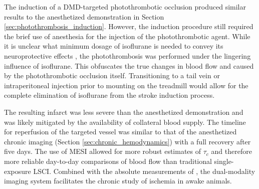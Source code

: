 The induction of a DMD-targeted photothrombotic occlusion produced similar results to the anesthetized demonstration in Section \ref{sec:photothrombosis_induction}. However, the induction procedure still required the brief use of anesthesia for the injection of the photothrombotic agent. While it is unclear what minimum dosage of isoflurane is needed to convey its neuroprotective effects \cite{Kapinya:ua}, the photothrombosis was performed under the lingering influence of isoflurane. This obfuscates the true changes in blood flow and  caused by the photothrombotic occlusion itself. Transitioning to a tail vein or intraperitoneal injection prior to mounting on the treadmill would allow for the complete elimination of isoflurane from the stroke induction process.

The resulting infarct was less severe than the anesthetized demonstration and was likely mitigated by the availability of collateral blood supply. The timeline for reperfusion of the targeted vessel was similar to that of the anesthetized chronic imaging (Section \ref{sec:chronic_hemodynamics}) with a full recovery after five days. The use of MESI allowed for more robust estimates of $\tau_c$ and therefore more reliable day-to-day comparisons of blood flow than traditional single-exposure LSCI. Combined with the absolute measurements of , the dual-modality imaging system facilitates the chronic study of ischemia in awake animals.



